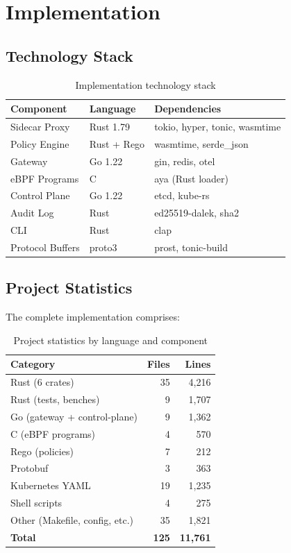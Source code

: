 \documentclass[runningheads]{llncs}
\begin{document}
\section{Implementation}

\subsection{Technology Stack}

\begin{table}[H]
\centering
\caption{Implementation technology stack}
\begin{tabular}{lll}
\toprule
Component & Language & Dependencies \\
\midrule
Sidecar Proxy & Rust 1.79 & tokio, hyper, tonic, wasmtime \\
Policy Engine & Rust + Rego & wasmtime, serde\_json \\
Gateway & Go 1.22 & gin, redis, otel \\
eBPF Programs & C & aya (Rust loader) \\
Control Plane & Go 1.22 & etcd, kube-rs \\
Audit Log & Rust & ed25519-dalek, sha2 \\
CLI & Rust & clap \\
Protocol Buffers & proto3 & prost, tonic-build \\
\bottomrule
\end{tabular}
\end{table}

\subsection{Project Statistics}

The complete implementation comprises:

\begin{table}[H]
\centering
\caption{Project statistics by language and component}
\begin{tabular}{lrr}
\toprule
Category & Files & Lines \\
\midrule
Rust (6 crates) & 35 & 4,216 \\
Rust (tests, benches) & 9 & 1,707 \\
Go (gateway + control-plane) & 9 & 1,362 \\
C (eBPF programs) & 4 & 570 \\
Rego (policies) & 7 & 212 \\
Protobuf & 3 & 363 \\
Kubernetes YAML & 19 & 1,235 \\
Shell scripts & 4 & 275 \\
Other (Makefile, config, etc.) & 35 & 1,821 \\
\midrule
\textbf{Total} & \textbf{125} & \textbf{11,761} \\
\bottomrule
\end{tabular}
\end{table}
\end{document}
